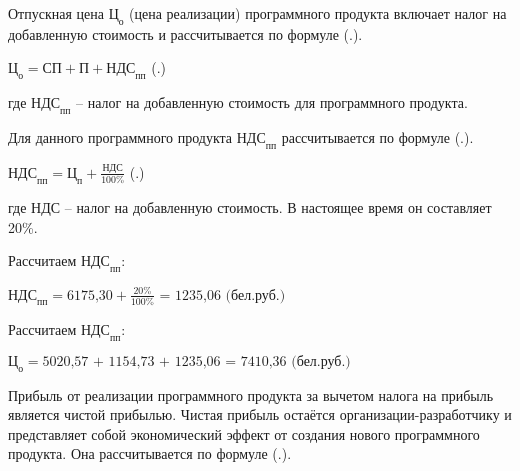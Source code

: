 {	\par \redline Отпускная цена $\textrm{Ц}_{\textrm{о}}$ (цена реализации) программного продукта включает налог на добавленную стоимость и рассчитывается по формуле (\thechaptercntr .\theformulacntr).

	\formulaspace \par \redline 
		$\textrm{Ц}_{\textrm{о}} = \textrm{СП} + \textrm{П} + \textrm{НДС}_{\textrm{пп}}$
	\hfill (\thechaptercntr .\theformulacntr) \redline
	\formulaspace \addtocounter{formulacntr}{1}

	\par \redline где $\textrm{НДС}_{\textrm{пп}}$ {--} налог на добавленную стоимость для программного продукта.

	\par \redline Для данного программного продукта $\textrm{НДС}_{\textrm{пп}}$ рассчитывается по формуле (\thechaptercntr .\theformulacntr).

	\formulaspace \par \redline 
		$\textrm{НДС}_{\textrm{пп}} = \textrm{Ц}_{\textrm{п}} + \frac{\textrm{НДС}}{\textrm{100\%}}$
	\hfill (\thechaptercntr .\theformulacntr) \redline
	\formulaspace \addtocounter{formulacntr}{1}

	\par \redline где $\textrm{НДС}$ {--} налог на добавленную стоимость. В настоящее время он составляет 20\%.

	\par \redline Рассчитаем $\textrm{НДС}_{\textrm{пп}}$:

	\formulaspace \par \redline 
		$\textrm{НДС}_{\textrm{пп}} = \textrm{6175,30} + \frac{\textrm{20\%}}{\textrm{100\%}} \textrm{ = 1235,06 (бел.руб.)}$
	\formulaspace

	\par \redline Рассчитаем $\textrm{НДС}_{\textrm{пп}}$:

	\formulaspace \par \redline 
		$\textrm{Ц}_{\textrm{о}} = \textrm{5020,57 + 1154,73 + 1235,06 = 7410,36 (бел.руб.)}$
	\formulaspace

	\par \redline Прибыль от реализации программного продукта за вычетом налога на прибыль является чистой прибылью. Чистая прибыль остаётся организации-разработчику и представляет собой экономический эффект от создания нового программного продукта. Она рассчитывается по формуле (\thechaptercntr .\theformulacntr).

}
